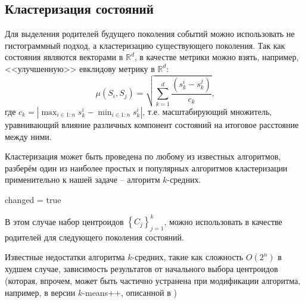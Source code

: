 \documentclass[12pt,a4paper]{article}
\newcommand{\R}{\ensuremath{\mathbb{R}}}
\begin{document}
\subsection{Кластеризация состояний}
Для выделения родителей будущего поколения событий можно использовать не гистограммный подход, а кластеризацию существующего поколения. Так как состояния являются векторами в $\R^d$, в качестве метрики можно взять, например, <<улучшенную>> евклидову метрику в $\R^d$:
\[\mu\left(S_i,S_j\right) = \sqrt{\sum_{k=1}^d\frac{\left(s^i_k-s^j_k\right)}{c_k}} \text{,} \] 
где $c_k = \left\vert\max_{i\in 1:n} s^i_k - \min_{i\in 1:n} s^i_k\right\vert$, т.е. масштабирующий множитель, уравнивающий влияние различных компонент состояний на итоговое расстояние между ними.
\par Кластеризация может быть проведена по любому из известных алгоритмов, разберём один из наиболее простых и популярных алгоритмов кластеризации применительно к нашей задаче -- алгоритм $k$-средних.
\begin{algorithm}
	\SetAlgoLined
	\DontPrintSemicolon
	changed = true\;
\end{algorithm}
\par В этом случае набор центроидов $\left\lbrace C_j\right\rbrace_{j=1}^k$, можно использовать в качестве родителей для следующего поколения состояний.
\par Известные недостатки алгоритма $k$-средних, такие как сложность $O\left(2^n\right)$ в худшем случае, зависимость результатов от начального выбора центроидов (которая, впрочем, может быть частично устранена при модификации алгоритма, например, в версии $k$-means++, описанной в \cite{Arthur2007}) 
\nocite{*}
\printbibliography
\end{document}
